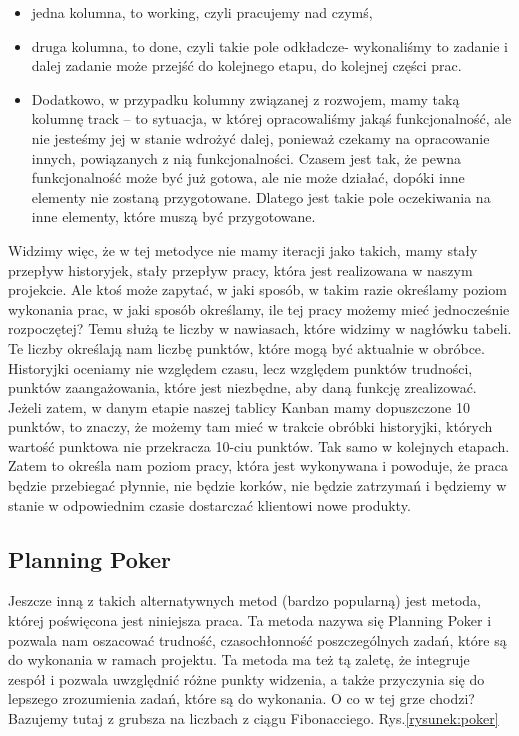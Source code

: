 \begin{itemize}
	\item jedna kolumna, to working, czyli pracujemy nad czymś,
	\item druga kolumna, to done, czyli takie pole odkładcze- wykonaliśmy to zadanie i dalej zadanie może przejść do kolejnego etapu, do kolejnej części prac.
	\item Dodatkowo, w przypadku kolumny związanej z rozwojem, mamy taką kolumnę track – to sytuacja, w której opracowaliśmy jakąś funkcjonalność, ale nie jesteśmy jej w stanie wdrożyć dalej, ponieważ czekamy na opracowanie innych, powiązanych z nią funkcjonalności. Czasem jest tak, że pewna funkcjonalność może być już gotowa, ale nie może działać, dopóki inne elementy nie zostaną przygotowane. Dlatego jest takie pole oczekiwania na inne elementy, które muszą być przygotowane.
\end{itemize}

Widzimy więc, że w tej metodyce nie mamy iteracji jako takich, mamy stały przepływ historyjek, stały przepływ pracy, która jest realizowana w naszym projekcie.
Ale ktoś może zapytać, w jaki sposób, w takim razie określamy poziom wykonania prac, w jaki sposób określamy, ile tej pracy możemy mieć jednocześnie rozpoczętej? 
Temu służą te liczby w nawiasach, które widzimy w nagłówku tabeli. Te liczby określają nam liczbę punktów, które mogą być aktualnie w obróbce.
Historyjki oceniamy nie względem czasu, lecz względem punktów trudności, punktów zaangażowania, które jest niezbędne, aby daną funkcję zrealizować. 
Jeżeli zatem, w danym etapie naszej tablicy Kanban mamy dopuszczone 10 punktów, to znaczy, że możemy tam mieć w trakcie obróbki historyjki, których wartość punktowa nie przekracza 10-ciu punktów. Tak samo w kolejnych etapach.
Zatem to określa nam poziom pracy, która jest wykonywana i powoduje, że praca będzie przebiegać płynnie, nie będzie korków, nie będzie zatrzymań i będziemy w stanie w odpowiednim czasie dostarczać klientowi nowe produkty.

\subsection{Planning Poker}

Jeszcze inną z takich alternatywnych metod (bardzo popularną)  jest metoda, której poświęcona jest niniejsza praca. Ta metoda nazywa się Planning Poker i pozwala nam oszacować trudność, czasochłonność poszczególnych zadań, które są do wykonania w ramach projektu. Ta metoda ma też tą zaletę, że integruje zespół i pozwala uwzględnić różne punkty widzenia, a także przyczynia się do lepszego zrozumienia zadań, które są do wykonania. O co w tej grze chodzi? Bazujemy tutaj z grubsza na liczbach z ciągu Fibonacciego. Rys.\ref{rysunek:poker}

